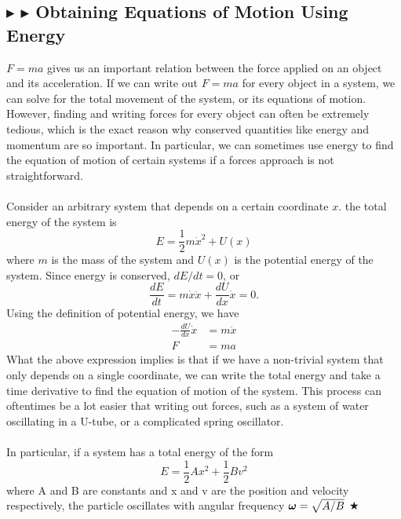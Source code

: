 %
%
\subsection{\color{Goldenrod} $\blacktriangleright$ \color{Orchid} $\blacktriangleright$ \color{black} Obtaining Equations of Motion Using Energy}\label{1.3.7}
$F=ma$ gives us an important relation between the force applied on an object and its acceleration. If we can write out $F=ma$ for every object in a system, we can solve for the total movement of the system, or its equations of motion. However, finding and writing forces for every object can often be extremely tedious, which is the exact reason why conserved quantities like energy and momentum are so important. In particular, we can sometimes use energy to find the equation of motion of certain systems if a forces approach is not straightforward. \\
\\
\noindent Consider an arbitrary system that depends on a certain coordinate $x$. the total energy of the system is
\begin{equation}
    E = \frac12 m\dot{x}^2 + U(x)
\end{equation}
\noindent where $m$ is the mass of the system and $U(x)$ is the potential energy of the system. Since energy is conserved, $dE/dt = 0$, or 
\begin{equation*}
    \frac{dE}{dt} = m\dot{x}\ddot{x} + \frac{dU}{dx}\dot{x} = 0.
\end{equation*}
\noindent Using the definition of potential energy, we have
\begin{align*}
    -\frac{dU}{dx}\dot{x} &= m\ddot{x} \\
    F &= ma
\end{align*}
\noindent What the above expression implies is that if we have a non-trivial system that only depends on a single coordinate, we can write the total energy and take a time derivative to find the equation of motion of the system. This process can oftentimes be a lot easier that writing out forces, such as a system of water oscillating in a U-tube, or a complicated spring oscillator. \\
\\
\noindent In particular, if a system has a total energy of the form
\begin{equation*}
    E = \frac12Ax^2 + \frac12Bv^2 
\end{equation*}
\noindent where A and B are constants and x and v are the position and velocity respectively, the particle oscillates with angular frequency $\boldsymbol{\omega} = \sqrt{A/B}$ $\bigstar$

